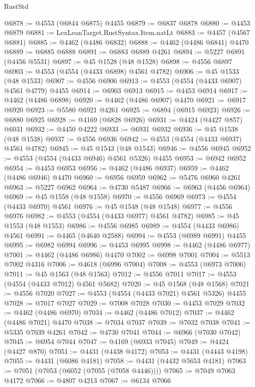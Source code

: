 \begin{lexlean}{RustStd}
\begin{coremodule}
@6878 := @4553 (@6844 @6875) @4455
@6879 := @6837 @6878
@6880 := @4453 @6879
@6881 := LexLeanTarget.RustSyntax.Item.natLt
@6883 := @4457 (@4567 @6881)
@6885 := @4462 (@4486 @6832)
@6888 := @4462 (@4486 @6841) @4470
@6889 := @6885 @6888
@6891 := @6883 @6889 @4261
@6894 := @5227 @6891 (@4456 @5531)
@6897 := @45 @1528 (@48 @1528)
@6898 := @4556 @6897
@6903 := @4553 (@4554 (@4433 @6898) @4561 @4782)
@6906 := @45 @1533 (@48 @1533)
@6907 := @4556 @6906
@6913 := @4553 (@4554 (@4433 @6907) @4561 @4779) @4455
@6914 := @6903 @6913
@6915 := @4453 @6914
@6917 := @4462 (@4486 @6898)
@6920 := @4462 (@4486 @6907) @4470
@6921 := @6917 @6920
@6923 := @5580 @6921 @4261
@6925 := @6894 (@6915 @6923)
@6926 := @6880 @6925
@6928 := @4169 (@6828 @6926)
@6931 := @4424 (@4427 @857) @6031
@6932 := @4450 @4222
@6933 := @6931 @6932
@6936 := @45 @1538 (@48 @1538)
@6937 := @4556 @6936
@6942 := @4553 (@4554 (@4433 @6937) @4561 @4782)
@6945 := @45 @1543 (@48 @1543)
@6946 := @4556 @6945
@6952 := @4553 (@4554 (@4433 @6946) @4561 @5326) @4455
@6953 := @6942 @6952
@6954 := @4453 @6953
@6956 := @4462 (@4486 @6937)
@6959 := @4462 (@4486 @6946) @4470
@6960 := @6956 @6959
@6962 := @5476 @6960 @4261
@6963 := @5227 @6962
@6964 := @4730 @5487
@6966 := @6963 (@4456 @6964)
@6969 := @45 @1558 (@48 @1558)
@6970 := @4556 @6969
@6973 := @4554 (@4433 @6970) @4561
@6976 := @45 @1548 (@48 @1548)
@6977 := @4556 @6976
@6982 := @4553 (@4554 (@4433 @6977) @4561 @4782)
@6985 := @45 @1553 (@48 @1553)
@6986 := @4556 @6985
@6989 := @4554 (@4433 @6986) @4561
@6991 := @4465 (@4640 @2588)
@6994 := @4553 (@6989 @6991) @4455
@6995 := @6982 @6994
@6996 := @4453 @6995
@6998 := @4462 (@4486 @6977)
@7001 := @4462 (@4486 @6986) @4470
@7002 := @6998 @7001
@7004 := @5513 @7002 @4316
@7006 := @4618 (@6996 @7004)
@7008 := @4553 (@6973 @7006)
@7011 := @45 @1563 (@48 @1563)
@7012 := @4556 @7011
@7017 := @4553 (@4554 (@4433 @7012) @4561 @5682)
@7020 := @45 @1568 (@48 @1568)
@7021 := @4556 @7020
@7027 := @4553 (@4554 (@4433 @7021) @4561 @5326) @4455
@7028 := @7017 @7027
@7029 := @7008 @7028
@7030 := @4453 @7029
@7032 := @4462 (@4486 @6970)
@7034 := @4462 (@4486 @7012)
@7037 := @4462 (@4486 @7021) @4470
@7038 := @7034 @7037
@7039 := @7032 @7038
@7041 := @5335 @7039 @4261
@7042 := @4730 @7041
@7044 := @6966 (@7030 @7042)
@7045 := @6954 @7044
@7047 := @4169 (@6933 @7045)
@7049 := @4424 (@4427 @870)
@7051 := @4431 (@4438 @4172)
@7053 := @4431 (@4443 @4198)
@7055 := @4431 (@6086 @4181)
@7058 := @4431 (@4432 @5653 @4181)
@7063 := @7051 (@7053 (@6052 (@7055 (@7058 @4446))))
@7065 := @7049 @7063 @4172
@7066 := @4807 @4213
@7067 := @6134 @7066

\end{coremodule}
\end{lexlean}
